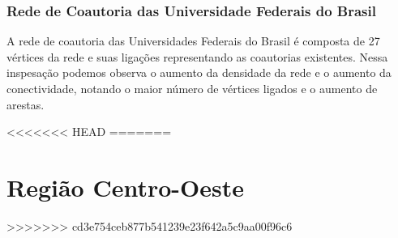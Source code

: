 \documentclass[12pt]{article}
\begin{document}
\subsubsection{Rede de Coautoria das Universidade Federais do Brasil}

A rede de coautoria das Universidades Federais do Brasil é composta de 27 vértices da rede e suas ligações representando as coautorias existentes. Nessa inspesação podemos observa o aumento da densidade da rede e o aumento da conectividade, notando o maior número de vértices ligados e o aumento de arestas.




<<<<<<< HEAD
=======
\section{Região Centro-Oeste}
>>>>>>> cd3e754ceb877b541239e23f642a5c9aa00f96c6
\end{document}
